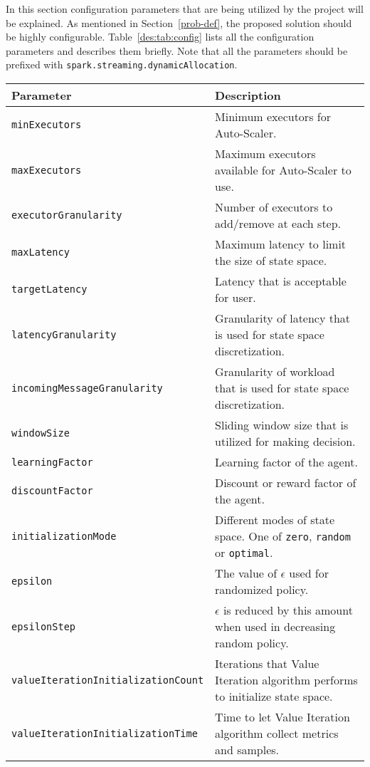 In this section configuration parameters that are being utilized by the project will be explained. As mentioned in Section~\ref{prob-def}, the proposed solution should be highly configurable. Table~\ref{des:tab:config} lists all the configuration parameters and describes them briefly. Note that all the parameters should be prefixed with \lstinline|spark.streaming.dynamicAllocation|.
\begin{table*}[h]
    \begin{tabularx}{\textwidth}{lX}
        \toprule
        \textbf{Parameter} & \textbf{Description}\\
        \midrule
        \lstinline|minExecutors| & Minimum executors for Auto-Scaler.\\
        \lstinline|maxExecutors| & Maximum executors available for Auto-Scaler to use. \\
        \lstinline|executorGranularity| & Number of executors to add/remove at each step. \\
        \lstinline|maxLatency| & Maximum latency to limit the size of state space. \\
        \lstinline|targetLatency| & Latency that is acceptable for user. \\
        \lstinline|latencyGranularity| & Granularity of latency that is used for state space discretization. \\
        \lstinline|incomingMessageGranularity| & Granularity of workload that is used for state space discretization. \\
        \lstinline|windowSize| & Sliding window size that is utilized for making decision. \\
        \lstinline|learningFactor| & Learning factor of the agent. \\
        \lstinline|discountFactor| & Discount or reward factor of the agent. \\
        \lstinline|initializationMode| & Different modes of state space. One of \lstinline|zero|, \lstinline|random| or \lstinline|optimal|. \\
        \lstinline|epsilon| & The value of $\epsilon$ used for randomized policy. \\
        \lstinline|epsilonStep| & $\epsilon$ is reduced by this amount when used in decreasing random policy. \\
        \lstinline|valueIterationInitializationCount| & Iterations that Value Iteration algorithm performs to initialize state space.\\
        \lstinline|valueIterationInitializationTime| & Time to let Value Iteration algorithm collect metrics and samples. \\

\end{tabularx}
\end{table*}
